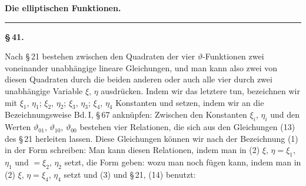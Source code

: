 
\begin{center}

\vspace{1em}
{\Large\bfseries Die elliptischen Funktionen.}

\vspace{0.5em}
\rule{0.3\textwidth}{0.4pt}
\end{center}

\begin{center}
\textbf{\S\,41. }
\end{center}

Nach \S\,21 bestehen zwischen den Quadraten der vier \(\vartheta\)-Funktionen
zwei voneinander unabhängige lineare Gleichungen, und man kann also zwei
von diesen Quadraten durch die beiden anderen oder auch alle vier durch
zwei unabhängige Variable \(\xi\), \(\eta\) ausdrücken. Indem wir das letztere tun,
bezeichnen wir mit \(\xi_1\), \(\eta_1\); \(\xi_2\), \(\eta_2\); \(\xi_3\), \(\eta_3\); \(\xi_4\), \(\eta_4\)
Konstanten und setzen, indem wir an die Bezeichnungsweise Bd.\,I, \S\,67
anknüpfen:
Zwischen den Konstanten \(\xi_i\), \(\eta_i\) und den Werten \(\vartheta_{01}\), \(\vartheta_{10}\),
\(\vartheta_{00}\) bestehen vier Relationen, die sich aus den Gleichungen (13) des
\S\,21 herleiten lassen. Diese Gleichungen können wir nach der Bezeichnung
(1) in der Form schreiben:
Man kann diesen Relationen, indem man in (2) \(\xi\), \(\eta = \xi_1\), \(\eta_1\)
und \(= \xi_2\), \(\eta_2\) setzt, die Form geben:
wozu man noch fügen kann, indem man in (2) \(\xi\), \(\eta = \xi_4\), \(\eta_4\) setzt
und (3) und \S\,21, (14) benutzt:
